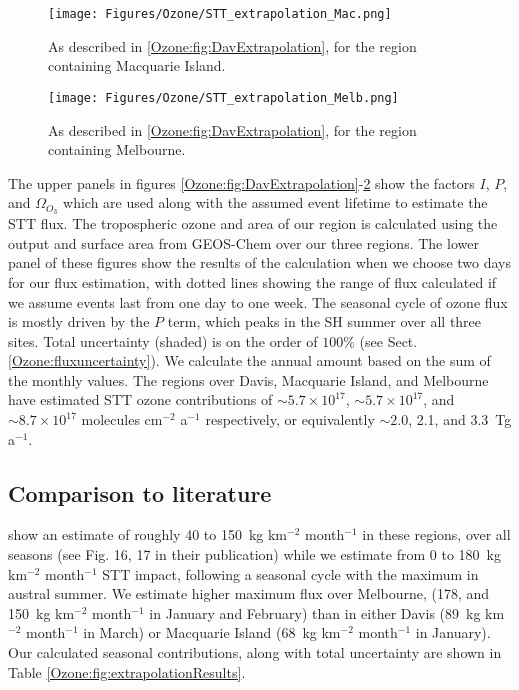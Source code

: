     \begin{figure}
      \texttt{[image: Figures/Ozone/STT\_extrapolation\_Mac.png]}
      \caption{%
        As described in \ref{Ozone:fig:DavExtrapolation}, for the region containing Macquarie Island.}
      \label{Ozone:fig:MacExtrapolation}
    \end{figure}
    
    \begin{figure}
      \texttt{[image: Figures/Ozone/STT\_extrapolation\_Melb.png]}
      \caption{%
        As described in \ref{Ozone:fig:DavExtrapolation}, for the region containing Melbourne.}
      \label{Ozone:fig:MelbExtrapolation}
    \end{figure}
    
    The upper panels in figures \ref{Ozone:fig:DavExtrapolation}-\ref{Ozone:fig:MelbExtrapolation} show the factors $I$, $P$, and $\Omega_{O_3}$ which are used along with the assumed event lifetime to estimate the STT flux.
    The tropospheric ozone and area of our region is calculated using the output and surface area from GEOS-Chem over our three regions.
    The lower panel of these figures show the results of the calculation when we choose two days for our flux estimation, with dotted lines showing the range of flux calculated if we assume events last from one day to one week.
    The seasonal cycle of ozone flux is mostly driven by the $P$ term, which peaks in the SH summer over all three sites.
    Total uncertainty (shaded) is on the order of $100\%$ (see Sect. \ref{Ozone:fluxuncertainty}). 
    We calculate the annual amount based on the sum of the monthly values.
    The regions over Davis, Macquarie Island, and Melbourne have estimated STT ozone contributions of $\sim 5.7 \times 10^{17}$, $\sim 5.7 \times 10^{17}$, and $\sim 8.7 \times 10^{17}$ molecules cm$^{-2}$ a$^{-1}$ respectively, or equivalently $\sim 2.0$, 2.1, and 3.3~Tg a$^{-1}$.
  
  \subsection{Comparison to literature}
    \cite{Skerlak2014} show an estimate of roughly 40 to 150~kg km$^{-2}$ month$^{-1}$ in these regions, over all seasons (see Fig. 16, 17 in their publication) while we estimate from 0 to 180~kg km$^{-2}$ month$^{-1}$ STT impact, following a seasonal cycle with the maximum in austral summer.
    We estimate higher maximum flux over Melbourne, (178, and 150~kg km$^{-2}$ month$^{-1}$ in January and February) than in either Davis (89~kg km$^{-2}$ month$^{-1}$ in March) or Macquarie Island (68~kg km$^{-2}$ month$^{-1}$ in January).
    Our calculated seasonal contributions, along with total uncertainty are shown in Table \ref{Ozone:fig:extrapolationResults}.
    

